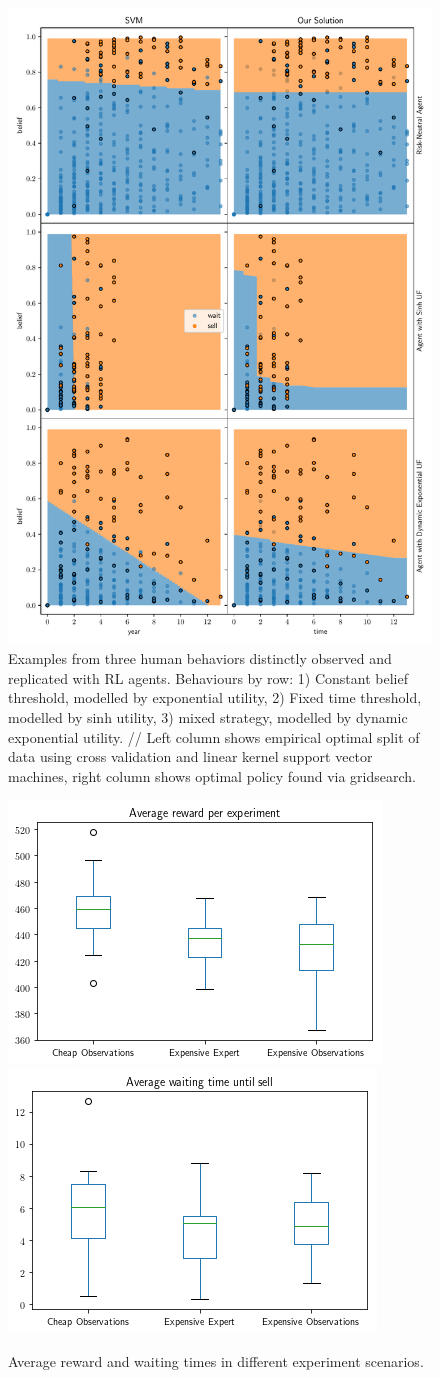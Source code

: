 
\begin{figure}
    \includegraphics[width=0.8\linewidth]{img/fit}
    \caption{Examples from three human behaviors distinctly observed and replicated with RL agents. Behaviours by row: 1) Constant belief threshold, modelled by exponential utility, 2) Fixed time threshold, modelled by sinh utility, 3) mixed strategy, modelled by dynamic exponential utility. // Left column shows empirical optimal split of data using cross validation and linear kernel support vector machines, right column shows optimal policy found via gridsearch.}
    \label{fig:svm_vs_value}
\end{figure}


\begin{figure}
\includegraphics[width=0.4\linewidth]{img/avg_reward.png}
\includegraphics[width=0.4\linewidth]{img/avg_waiting.png}
\caption{Average reward and waiting times in different experiment scenarios.}
\end{figure}
